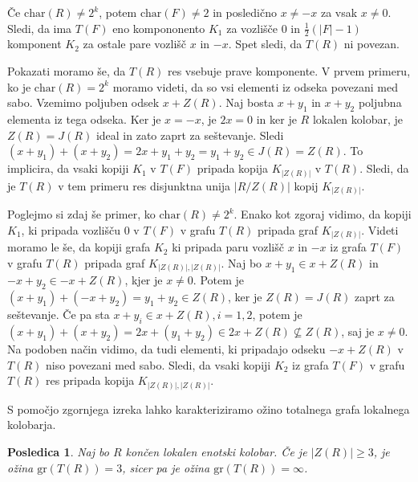\documentclass[a4paper, 12pt]{amsart}
\theoremstyle{definition} %
\theoremstyle{plain} %
\newtheorem{posledica}[definicija]{Posledica}
\begin{document}
Če $\textrm{char}(R) \neq 2^k$, potem $\textrm{char}(F)\neq 2$ in posledično $x\neq -x$ za vsak $x\neq 0$. Sledi, da ima $T(F)$ eno kompononento $K_1$ za vozlišče 0 in $\frac{1}{2}(|F| - 1)$ komponent $K_2$ za ostale pare vozlišč $x$ in $-x$. Spet sledi, da $T(R)$ ni povezan.

 Pokazati moramo še, da $T(R)$ res vsebuje prave komponente.
V prvem primeru, ko je $ \textrm{char}(R) = 2^k$ moramo videti, da so vsi elementi iz odseka povezani med sabo. Vzemimo poljuben odsek $x+Z(R)$. Naj bosta $x+ y_1$ in $x+y_2$ poljubna elementa iz tega odseka. Ker je $x=-x$, je $2x = 0$ in ker je $R$ lokalen kolobar, je $Z(R) = J(R)$ ideal in zato zaprt za seštevanje. Sledi $(x+ y_1 ) + (x+y_2)  = 2x + y_1 +y_2 = y_1 + y_2 \in J(R) = Z(R)$. To implicira, da vsaki kopiji $K_1$ v $T(F)$ pripada kopija $K_{|Z(R)|}$ v $T(R)$. Sledi, da je $T(R)$ v tem primeru res disjunktna unija $|R/Z(R)|$ kopij $K_{|Z(R)|}$.

Poglejmo si zdaj še primer, ko $\textrm{char}(R) \neq 2^k$. Enako kot zgoraj vidimo, da kopiji $K_1$, ki pripada vozlišču $0$ v $T(F)$ v grafu $T(R)$ pripada graf $K_{|Z(R)|}$. Videti moramo le še, da kopiji grafa  $K_2$ ki pripada paru vozlišč $x$ in $-x$ iz grafa $T(F)$ v grafu $T(R)$ pripada graf $K_{|Z(R)|, |Z(R)|}$. Naj bo $x+ y_1\in x  + Z(R)$ in $-x + y_2\in -x + Z(R)$, kjer je $x\neq 0$. Potem je $(x+y_1) + (-x + y_2 ) = y_1 + y_2\in Z(R)$, ker je $Z(R) = J(R)$ zaprt za seštevanje. Če pa sta $x+y_i \in x + Z(R), i=1,2$, potem je $(x+y_1) + (x+y_2) = 2x + (y_1 + y_2) \in 2x + Z(R) \not\subseteq Z(R)$, saj je $x\neq 0$. Na podoben način vidimo, da tudi elementi, ki pripadajo odseku $-x + Z(R)$ v $T(R)$ niso povezani med sabo. Sledi, da vsaki kopiji $K_2$ iz grafa $T(F)$ v grafu $T(R)$ res pripada kopija $K_{|Z(R)|,|Z(R)|}$.
\endproof

S pomočjo zgornjega izreka lahko karakteriziramo ožino totalnega grafa lokalnega kolobarja.

\begin{posledica}
Naj bo $R$ končen lokalen enotski kolobar. Če je $|Z(R)| \ge 3$, je ožina $\textrm{gr}(T(R)) = 3$, sicer pa je ožina $\textrm {gr}(T(R)) = \infty$.
\end{posledica}
\end{document}

